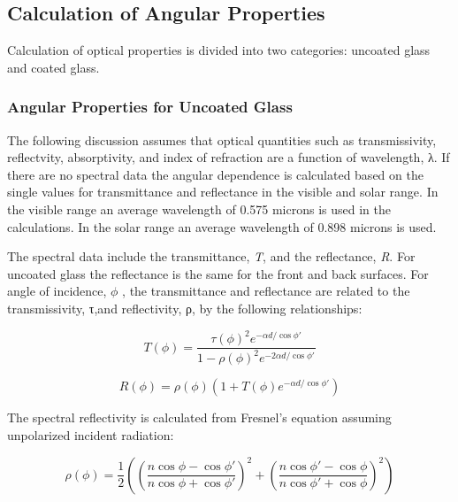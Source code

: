 \subsection{Calculation of Angular Properties}\label{calculation-of-angular-properties}

Calculation of optical properties is divided into two categories: uncoated glass and coated glass.

\subsubsection{Angular Properties for Uncoated Glass}\label{angular-properties-for-uncoated-glass}

The following discussion assumes that optical quantities such as transmissivity, reflectvity, absorptivity, and index of refraction are a function of wavelength, λ. If there are no spectral data the angular dependence is calculated based on the single values for transmittance and reflectance in the visible and solar range. In the visible range an average wavelength of 0.575 microns is used in the calculations. In the solar range an average wavelength of 0.898 microns is used.

The spectral data include the transmittance, \emph{T}, and the reflectance, \emph{R}. For uncoated glass the reflectance is the same for the front and back surfaces. For angle of incidence, \(\phi\) , the transmittance and reflectance are related to the transmissivity, τ,and reflectivity, ρ, by the following relationships:

\begin{equation}
T(\phi ) = \frac{{\tau {{(\phi )}^2}{e^{ - \alpha d/\cos \phi '}}}}{{1 - \rho {{(\phi )}^2}{e^{ - 2\alpha d/\cos \phi '}}}}
\end{equation}

\begin{equation}
R(\phi ) = \rho (\phi )\left( {1 + T(\phi ){e^{ - \alpha d/\cos \phi '}}} \right)
\end{equation}

The spectral reflectivity is calculated from Fresnel's equation assuming unpolarized incident radiation:

\begin{equation}
\rho (\phi ) = \frac{1}{2}\left( {{{\left( {\frac{{n\cos \phi  - \cos \phi '}}{{n\cos \phi  + \cos \phi '}}} \right)}^2} + {{\left( {\frac{{n\cos \phi ' - \cos \phi }}{{n\cos \phi ' + \cos \phi }}} \right)}^2}} \right)
\end{equation}

